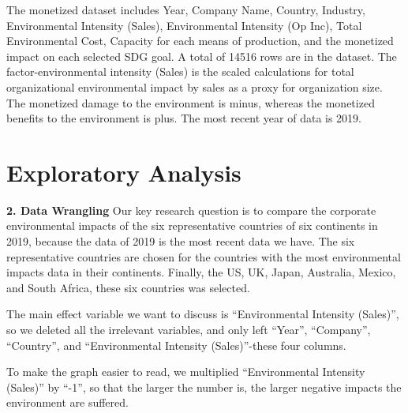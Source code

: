 \documentclass[
  12pt,
]{article}
\begin{document}
The monetized dataset includes Year, Company Name, Country, Industry,
Environmental Intensity (Sales), Environmental Intensity (Op Inc), Total
Environmental Cost, Capacity for each means of production, and the
monetized impact on each selected SDG goal. A total of 14516 rows are in
the dataset. The factor-environmental intensity (Sales) is the scaled
calculations for total organizational environmental impact by sales as a
proxy for organization size. The monetized damage to the environment is
minus, whereas the monetized benefits to the environment is plus. The
most recent year of data is 2019.

\newpage

\hypertarget{exploratory-analysis}{%
\section{Exploratory Analysis}\label{exploratory-analysis}}

\textbf{2. Data Wrangling} Our key research question is to compare the
corporate environmental impacts of the six representative countries of
six continents in 2019, because the data of 2019 is the most recent data
we have. The six representative countries are chosen for the countries
with the most environmental impacts data in their continents. Finally,
the US, UK, Japan, Australia, Mexico, and South Africa, these six
countries was selected.

The main effect variable we want to discuss is ``Environmental Intensity
(Sales)'', so we deleted all the irrelevant variables, and only left
``Year'', ``Company'', ``Country'', and ``Environmental Intensity
(Sales)''-these four columns.

To make the graph easier to read, we multiplied ``Environmental
Intensity (Sales)'' by ``-1'', so that the larger the number is, the
larger negative impacts the environment are suffered.
\end{document}
